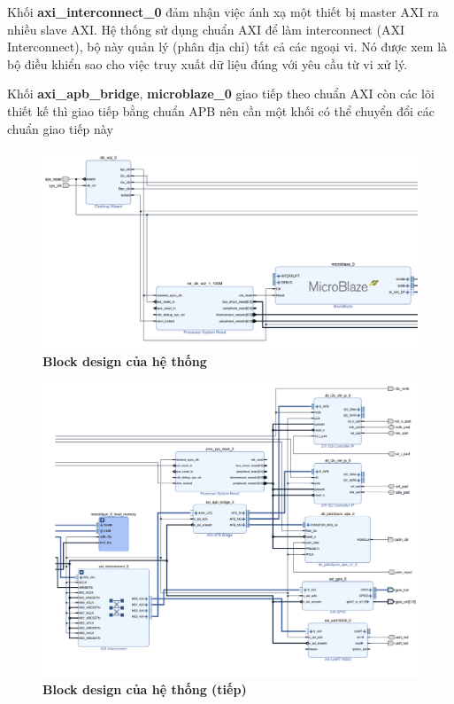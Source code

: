  Khối \textbf{axi\_interconnect\_0} đảm nhận việc ánh xạ một thiết bị master AXI ra nhiều slave AXI. Hệ thống sử dụng chuẩn AXI để làm interconnect (AXI Interconnect), bộ này quản lý (phân địa chỉ) tất cả các ngoại vi. Nó được xem là bộ điều khiển sao cho việc truy xuất dữ liệu đúng với yêu cầu từ vi xử lý.

Khối \textbf{axi\_apb\_bridge}, \textbf{microblaze\_0} giao tiếp theo chuẩn AXI còn các lõi 
thiết kế thì giao tiếp bằng chuẩn APB nên cần một khối có thể chuyển đổi các chuẩn 
giao tiếp này

\begin{figure}[H]
    \centering
    \includegraphics[width=15cm]{Images/Chuong5/fpga/block_design_1.png}
    \caption[Block design của hệ thống]{\bfseries \fontsize{12pt}{0pt}\selectfont Block design của hệ thống}
    \label{bd1}
\end{figure}

\begin{figure}[H]
    \centering
    \includegraphics[width=15cm]{Images/Chuong5/fpga/block_design_2.png}
    \caption[Block design của hệ thống (tiếp)]{\bfseries \fontsize{12pt}{0pt}\selectfont Block design của hệ thống (tiếp)}
    \label{bd2}
\end{figure}

